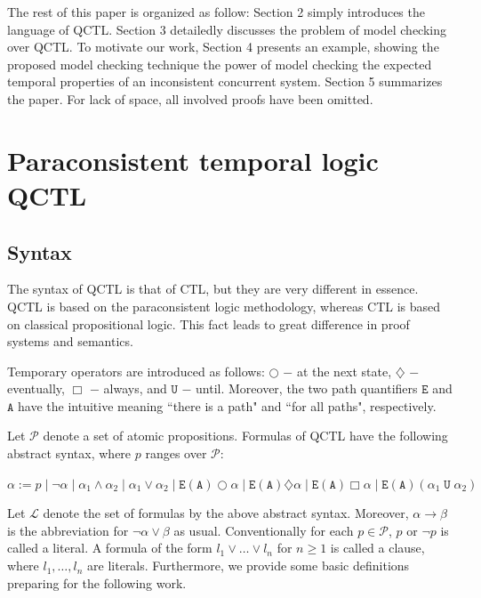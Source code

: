 \documentclass{entcs}
\begin{document}
The rest of this paper is organized as follow: Section 2 simply
introduces the language of QCTL. Section 3 detailedly discusses the
problem of model checking over QCTL. To motivate our work, Section 4
presents an example, showing the proposed model checking technique
the power of model checking the expected temporal properties of an
inconsistent concurrent system. Section 5 summarizes the paper. For
lack of space, all involved proofs have been
omitted.\section{Paraconsistent temporal logic QCTL} \label{QCTL}

\subsection{Syntax} \label{QCTL:syn}

The syntax of QCTL is that of CTL, but they are very different in
essence. QCTL is based on the paraconsistent logic methodology,
whereas CTL is based on classical propositional logic. This fact
leads to great difference in proof systems and semantics.

Temporary operators are introduced as follows: $\bigcirc$ $-$ at
the next state, $\diamondsuit$ $-$ eventually,  $\Box$ $-$ always,
and  $\texttt{U}$ $-$ until. Moreover, the two path quantifiers
$\texttt{E}$ and $\texttt{A}$ have the intuitive meaning  ``there
is a path" and ``for all paths", respectively.

Let $\mathcal{P}$ denote a set of atomic propositions. Formulas of
QCTL have the following abstract syntax, where $p$ ranges over
$\mathcal{P}$:
\begin{center}
$\alpha:=p\;|\;\neg\alpha\;|\;\alpha_1\wedge\alpha_2\;|\;\alpha_1\vee\alpha_2\;|\;
\texttt{E}(\texttt{A})\bigcirc\alpha\;|\;
\texttt{E}(\texttt{A})\diamondsuit\alpha\;|\;\texttt{E}(\texttt{A})\Box\alpha\;|\;
\texttt{E}(\texttt{A})(\alpha_1\;\texttt{U}\;\alpha_2)$
\end{center}
Let $\mathcal{L}$ denote the set of formulas by the above abstract
syntax. Moreover, $\alpha\rightarrow\beta$ is the abbreviation for
$\neg\alpha\vee \beta$ as usual. Conventionally for each
$p\in\mathcal{P}$, $p$ or $\neg p$ is called a literal. A formula
of the form $l_1\vee\ldots\vee l_n$ for $n\geq 1$ is called a
clause, where $l_1, \ldots, l_n$ are literals. Furthermore, we
provide some basic definitions preparing for the following work.\\
\end{document}
